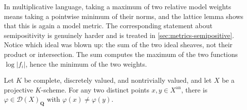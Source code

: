In multiplicative language, taking a maximum of two relative model
weights means taking a pointwise minimum of their norms, and the lattice
lemma shows that this is again a model metric. The
corresponding statement about semipositivity is genuinely harder and is
treated in \cref{sec:metrics-semipositive}. Notice which ideal was blown up:
the sum of the two ideal sheaves, not their product or intersection. The
sum computes the maximum of the two functions $\log|f_i|$, hence the
minimum of the two weights.

\begin{lemma}
\label{lem:metrics-model-separation}
Let $K$ be complete, discretely valued, and nontrivially valued, and let
$X$ be a projective $K$-scheme. For any two distinct points
$x,y\in X^{\mathrm{an}}$, there is $\varphi\in\mathcal D(X)_{\mathbf Q}$
with $\varphi(x)\ne\varphi(y)$.
\end{lemma}

